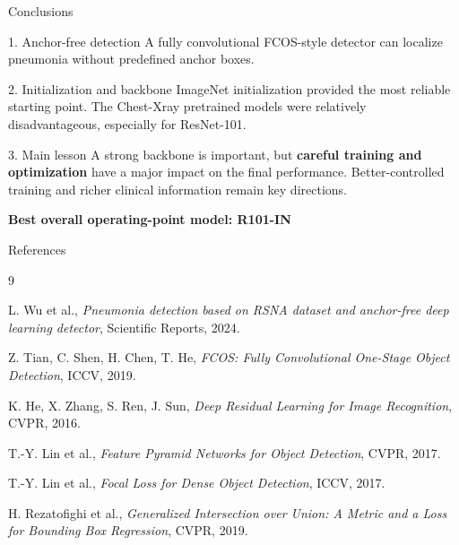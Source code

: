 \documentclass[aspectratio=169,11pt]{beamer}
\begin{document}
\begin{frame}{Conclusions}

\begin{block}{1. Anchor-free detection}
\centering
A fully convolutional FCOS-style detector can localize pneumonia
without predefined anchor boxes.
\end{block}

\vspace{0.2cm}

\begin{block}{2. Initialization and backbone}
\centering
ImageNet initialization provided the most reliable starting point.
The Chest-Xray pretrained models were relatively disadvantageous,
especially for ResNet-101.
\end{block}

\vspace{0.2cm}

\begin{block}{3. Main lesson}
\centering
A strong backbone is important, but \textbf{careful training and optimization}
have a major impact on the final performance.
Better-controlled training and richer clinical information remain key directions.
\end{block}

\vspace{0.3cm}

\centering
\textbf{Best overall operating-point model: R101-IN}

\end{frame}




\begin{frame}{References}

\footnotesize

\begin{thebibliography}{9}

L. Wu et al.,
\textit{Pneumonia detection based on RSNA dataset and anchor-free
deep learning detector},
Scientific Reports, 2024.

Z. Tian, C. Shen, H. Chen, T. He,
\textit{FCOS: Fully Convolutional One-Stage Object Detection},
ICCV, 2019.

K. He, X. Zhang, S. Ren, J. Sun,
\textit{Deep Residual Learning for Image Recognition},
CVPR, 2016.

T.-Y. Lin et al.,
\textit{Feature Pyramid Networks for Object Detection},
CVPR, 2017.

T.-Y. Lin et al.,
\textit{Focal Loss for Dense Object Detection},
ICCV, 2017.

H. Rezatofighi et al.,
\textit{Generalized Intersection over Union: A Metric and a Loss
for Bounding Box Regression},
CVPR, 2019.

\end{thebibliography}

\end{frame}




\end{document}
